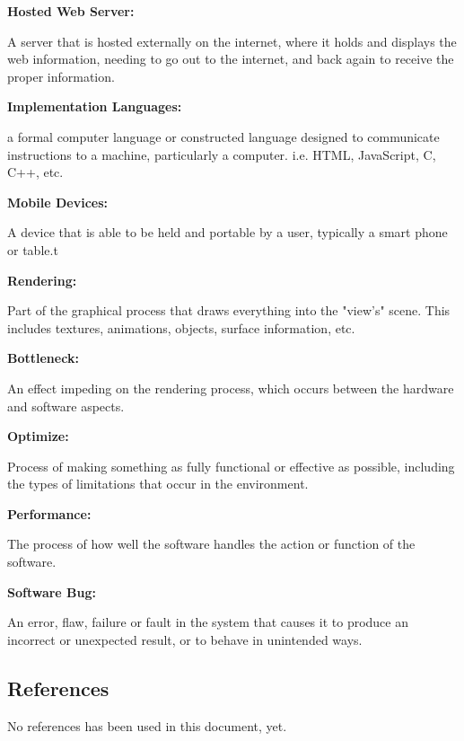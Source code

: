 \documentclass[letterpaper,10pt,titlepage,draftclsnofoot,onecolumn,compsoc,utf8,latin1]{IEEEtran}
\begin{document}
\begin{singlespace}
\begin{enumerate}[labelsep=2em,leftmargin=.5in]
    {\item \bfseries Hosted Web Server: } A server that is hosted externally on the internet, where it holds and displays the web information, needing to go out to the internet, and back again to receive the proper information. \vspace{.1cm}
    {\item \bfseries Implementation Languages: } a formal computer language or constructed language designed to communicate instructions to a machine, particularly a computer. i.e. HTML, JavaScript, C, C++, etc. \vspace{.1cm}
    {\item \bfseries Mobile Devices: } A device that is able to be held and portable by a user, typically a smart phone or table.t\vspace{.1cm}
    {\item \bfseries Rendering: } Part of the graphical process that draws everything into the "view's" scene. This includes textures, animations, objects, surface information, etc. \vspace{.1cm}
    {\item \bfseries Bottleneck: } An effect impeding on the rendering process, which occurs between the hardware and software aspects. \vspace{.1cm}
    {\item \bfseries Optimize: } Process of making something as fully functional or effective as possible, including the types of limitations that occur in the environment. \vspace{.1cm}
    {\item \bfseries Performance: } The process of how well the software handles the action or function of the software.
    {\item \bfseries Software Bug: } An error, flaw, failure or fault in the system that causes it to produce an incorrect or unexpected result, or to behave in unintended ways. \vspace{.1cm}
\end{enumerate}

\end{singlespace}

\subsection{References}
\begin{singlespace}
\noindent
No references has been used in this document, yet.
\end{singlespace}
\end{document}
